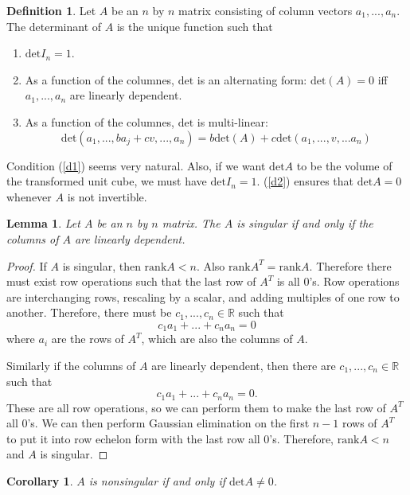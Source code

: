 \documentclass[12pt,reqno]{amsart}
\def\R{\mathbb{R}}
\renewcommand{\det}{\mathrm{det}}
\newcommand{\rank}{\mathrm{rank}}
\newtheorem{corollary}{Corollary}[section]
\newtheorem{lemma}{Lemma}[section]
\theoremstyle{definition}
\newtheorem{definition}{Definition}[section]
\begin{document}
\begin{definition}\label{deta}
  Let $A$ be an $n$ by $n$ matrix consisting of column vectors $a_1,
  ..., a_n$. The determinant of $A$ is the unique function such that
  \begin{enumerate}
  \item\label{d1} $\det I_n = 1$.
  \item\label{d2} As a function of the columnes, $\det$ is an
    alternating form: 
    $\det (A) = 0$ iff $a_1, ..., a_n$ are linearly dependent.
  \item\label{d3} As a function of the columnes, $\det$ is multi-linear:
    \[
    \det(a_1, ..., b a_j + c v, ..., a_n) = b\det(A) +
    c\det(a_1,...,v,...a_n) 
    \]
  \end{enumerate}
\end{definition}
Condition (\ref{d1}) seems very natural. Also, if we want $\det A$ to
be the volume of the transformed unit cube, we must have $\det I_n =
1$. (\ref{d2}) ensures that $\det A = 0$ whenever $A$ is not
invertible. 
\begin{lemma}
  Let $A$ be an $n$ by $n$ matrix. The $A$ is singular if and only if
  the columns of $A$ are linearly dependent.
\end{lemma}
\begin{proof}
  If $A$ is singular, then $\rank A < n$. Also $\rank A^T = \rank A$. 
  Therefore there must exist row operations such that the last row of
  $A^T$ is all $0$'s. Row operations are interchanging rows, rescaling
  by a scalar, and adding multiples of one row to another. Therefore,
  there must be $c_1, ..., c_n \in \R$ such that
  \[ c_1 a_1 + ... + c_n a_n = 0 \]
  where $a_i$ are the rows of $A^T$, which are also the columns of
  $A$.

  Similarly if the columns of $A$ are linearly dependent, then there
  are $c_1, ..., c_n \in \R$ such that
  \[ c_1 a_1 + ... + c_n a_n = 0. \]
  These are all row operations, so we can perform them to make the
  last row of $A^T$ all $0$'s. We can then perform Gaussian
  elimination on the first $n-1$ rows of $A^T$ to put it into row
  echelon form with the last row all $0$'s. Therefore, $\rank A<n$ and
  $A$ is singular.
\end{proof}
\begin{corollary}\label{cor:dns}
  $A$ is nonsingular if and only if $\det A \neq 0$.
\end{corollary}
\end{document}
